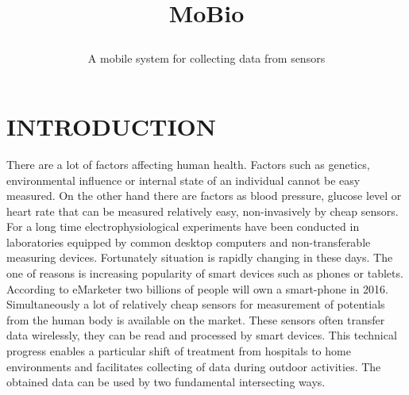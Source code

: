 \documentclass[a4paper,twoside]{article}
\begin{document}
\title{MoBio\subtitle{A mobile system for collecting data from sensors} }

\author{
}   



\onecolumn \maketitle \normalsize \vfill

\section{\uppercase{Introduction}}
\label{sec:introduction}

\noindent 
There are a lot of factors affecting human health. Factors such as genetics, environmental influence or internal state of an individual cannot be easy measured. On the other hand there are factors as blood pressure, glucose level or heart rate that can be measured relatively easy, non-invasively by cheap sensors. For a long time electrophysiological experiments have been conducted in laboratories equipped by common desktop computers and non-transferable measuring devices. Fortunately situation is rapidly changing in these days. The one of reasons is increasing popularity of smart devices such as phones or tablets. According to eMarketer \cite{emark} two billions of people will own a smart-phone in 2016. Simultaneously a lot of relatively cheap sensors for measurement of potentials from the human body is available on the market. These sensors often transfer data wirelessly, they can be read and processed by smart devices. This technical progress enables a particular shift of treatment from hospitals to home environments and facilitates collecting of data during outdoor activities. The obtained data can be used by two fundamental intersecting ways. 
\end{document}
